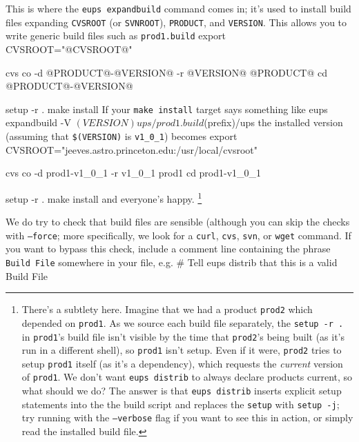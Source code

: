 \documentclass{article}
\newcommand{\code}[1]{\texttt{#1}}
\let\overbatim=\verbatim
\let\oendverbatim=\endverbatim
\renewenvironment{verbatim}
{\center\minipage{16cm}\overbatim}
{\oendverbatim\endminipage\endcenter}
\begin{document}
This is where the \code{eups expandbuild} command comes in;  it's used to install
build files expanding \code{CVSROOT} (or \code{SVNROOT}), \code{PRODUCT}, and
\code{VERSION}.  This allows you to write generic build files such as \code{prod1.build}
\begin{verbatim}
    export CVSROOT="@CVSROOT@"

    cvs co -d @PRODUCT@-@VERSION@ -r @VERSION@ @PRODUCT@
    cd @PRODUCT@-@VERSION@

    setup -r .
    make install
\end{verbatim}
If your \code{make install} target says something like
\begin{verbatim}
      eups expandbuild -V $(VERSION) ups/prod1.build $(prefix)/ups
\end{verbatim}
the installed version (assuming that \code{\$(VERSION)} is
\code{v1\_0\_1}) becomes
\begin{verbatim}
    export CVSROOT="jeeves.astro.princeton.edu:/usr/local/cvsroot"

    cvs co -d prod1-v1_0_1 -r v1_0_1 prod1
    cd prod1-v1_0_1

    setup -r .
    make install
\end{verbatim}
and everyone's happy.  \footnote{
There's a subtlety here.  Imagine that we had a product \code{prod2}
which depended on \code{prod1}.
As we source each build file separately,
the \code{setup -r .} in \code{prod1}'s build file isn't visible by
the time that \code{prod2}'s being built (as it's run in a different shell), so
\code{prod1} isn't setup.  Even if it were, \code{prod2}
tries to setup \code{prod1} itself (as it's a dependency), which requests the \emph{current} version
of \code{prod1}.  We don't want \code{eups distrib} to always declare
products current, so what should we do?  The answer is that \code{eups distrib}
inserts explicit setup statements into the the build script
and replaces the \code{setup} with \code{setup -j}; try
running with the \code{--verbose} flag if you want to see this in action,
or simply read the installed build file.
}

We do try to check that build files are sensible (although you can skip the
checks with \code{--force};  more specifically, we look for a \code{curl},
\code{cvs}, \code{svn}, or \code{wget} command.  If you want to bypass
this check, include a comment line containing the phrase \code{Build File}
somewhere in your file, e.g.
\begin{verbatim}
# Tell eups distrib that this is a valid Build File
\end{verbatim}
\end{document}

